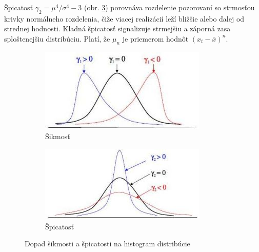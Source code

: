 Špicatosť $\gamma_2 = \mu^4 / \sigma^4 - 3$ (obr. \ref{fig:kurtosis}) porovnáva rozdelenie pozorovaní so strmosťou krivky normálneho rozdelenia, čiže viacej realizácií leží bližšie alebo ďalej od strednej hodnosti. Kladná špicatosť signalizuje strmejšiu 
a záporná zasa sploštenejšiu distribúciu. Platí, že $\mu_n $ je priemerom hodnôt $(x_t - \bar{x})^n$.
\begin{figure}[h]
\centering
\begin{subfigure}[b]{0.48\textwidth}
    \centering
    \includegraphics[width=\textwidth]{figures/skewness.png}
    \caption{Šikmosť}
    \label{fig:skewness}
\end{subfigure}
\hfill
\begin{subfigure}[b]{0.48\textwidth}
    \centering
    \includegraphics[width=\textwidth]{figures/kurtosis.png}
    \caption{Špicatosť}
    \label{fig:kurtosis}
\end{subfigure}
\caption{Dopad šikmosti a špicatosti na histogram distribúcie}
\end{figure}

